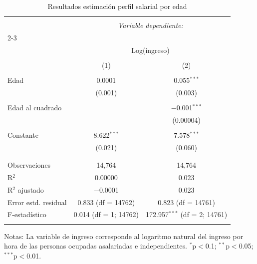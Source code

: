 \documentclass[12pt,a4paper,onecolumn]{article}
\begin{document}
\begin{table}[htbp] \centering 
  \caption{Resultados estimación perfil salarial por edad} 
  \label{tab:regresion_ec1} 
\begin{tabular}{@{\extracolsep{5pt}}lcc} 
\\[-1.8ex]\hline 
\hline \\[-1.8ex] 
 & \multicolumn{2}{c}{\textit{Variable dependiente:}} \\ 
\cline{2-3} 
\\[-1.8ex] & \multicolumn{2}{c}{Log(ingreso)} \\ 
\\[-1.8ex] & (1) & (2)\\ 
\hline \\[-1.8ex] 
 Edad & 0.0001 & 0.055$^{***}$ \\ 
  & (0.001) & (0.003) \\ 
  & & \\ 
 Edad al cuadrado &  & $-$0.001$^{***}$ \\ 
  &  & (0.00004) \\ 
  & & \\ 
 Constante & 8.622$^{***}$ & 7.578$^{***}$ \\ 
  & (0.021) & (0.060) \\ 
  & & \\ 
\hline \\[-1.8ex] 
Observaciones & 14,764 & 14,764 \\ 
R$^{2}$ & 0.00000 & 0.023 \\ 
R$^{2}$ ajustado & $-$0.0001 & 0.023 \\ 
Error estd. residual & 0.833 (df = 14762) & 0.823 (df = 14761) \\ 
F-estadístico & 0.014 (df = 1; 14762) & 172.957$^{***}$ (df = 2; 14761) \\ 
\hline 
\hline \\[-1.8ex] 
\end{tabular} 
\begin{minipage}{14cm}
\small Notas: La variable de ingreso corresponde al logaritmo natural del ingreso por hora de las personas ocupadas asalariadas e independientes. $^{*}$p$<$0.1; $^{**}$p$<$0.05; $^{***}$p$<$0.01.
\end{minipage}
\end{table}
\end{document}
